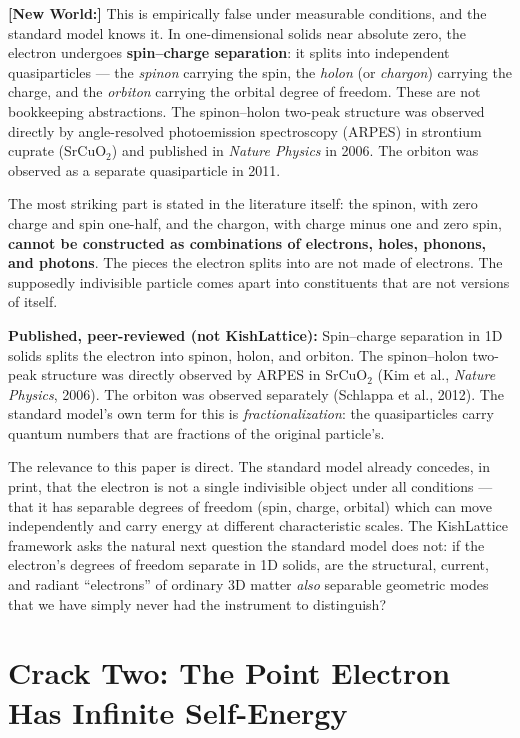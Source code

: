 \documentclass[11pt, letterpaper, openany]{book}
\newcommand{\newworldcmd}[1]{\noindent\textbf{\color{kishblue}[New World:]}
  #1\medskip}
\begin{document}
\newworldcmd{This is empirically false under measurable conditions, and
the standard model knows it. In one-dimensional solids near absolute zero,
the electron undergoes \textbf{spin--charge separation}: it splits into
independent quasiparticles --- the \emph{spinon} carrying the spin, the
\emph{holon} (or \emph{chargon}) carrying the charge, and the
\emph{orbiton} carrying the orbital degree of freedom. These are not
bookkeeping abstractions. The spinon--holon two-peak structure was
observed directly by angle-resolved photoemission spectroscopy (ARPES)
in strontium cuprate (SrCuO$_2$) and published in \emph{Nature Physics}
in 2006. The orbiton was observed as a separate quasiparticle in 2011.
 
The most striking part is stated in the literature itself: the spinon,
with zero charge and spin one-half, and the chargon, with charge minus
one and zero spin, \textbf{cannot be constructed as combinations of
electrons, holes, phonons, and photons}. The pieces the electron splits
into are not made of electrons. The supposedly indivisible particle comes
apart into constituents that are not versions of itself.}
 
\begin{empiricalbox}
\textbf{Published, peer-reviewed (not KishLattice):}
Spin--charge separation in 1D solids splits the electron into spinon,
holon, and orbiton. The spinon--holon two-peak structure was directly
observed by ARPES in SrCuO$_2$ (Kim et al., \emph{Nature Physics}, 2006).
The orbiton was observed separately (Schlappa et al., 2012). The standard
model's own term for this is \emph{fractionalization}: the quasiparticles
carry quantum numbers that are fractions of the original particle's.
\end{empiricalbox}
 
The relevance to this paper is direct. The standard model already concedes,
in print, that the electron is not a single indivisible object under all
conditions --- that it has separable degrees of freedom (spin, charge,
orbital) which can move independently and carry energy at different
characteristic scales. The KishLattice framework asks the natural next
question the standard model does not: if the electron's degrees of freedom
separate in 1D solids, are the structural, current, and radiant
``electrons'' of ordinary 3D matter \emph{also} separable geometric modes
that we have simply never had the instrument to distinguish?
 
\section{Crack Two: The Point Electron Has Infinite Self-Energy}
 
\end{document}
